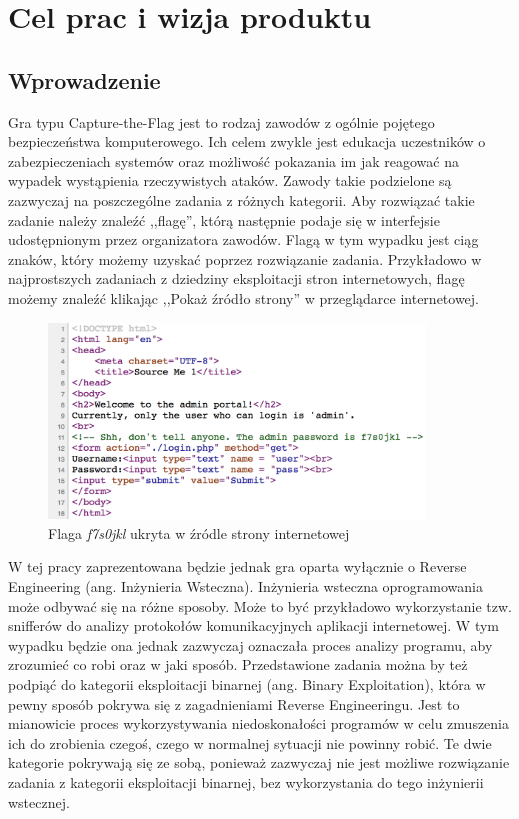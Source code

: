 \documentclass[language=polish,type=eng]{aghmodern}
\author{Piotr Szczygieł}
\date{2020}
\begin{document}
\frontmatter
\maketitle
\tableofcontents

\mainmatter

\chapter{Cel prac i wizja produktu}

\section{Wprowadzenie}

Gra typu Capture-the-Flag jest to rodzaj zawodów z ogólnie pojętego
bezpieczeństwa komputerowego. Ich celem zwykle jest edukacja uczestników
o zabezpieczeniach systemów oraz możliwość pokazania im jak reagować
na wypadek wystąpienia rzeczywistych ataków. Zawody takie podzielone są zazwyczaj
na poszczególne zadania z różnych kategorii. Aby rozwiązać takie zadanie należy
znaleźć ,,flagę'', którą następnie podaje się w interfejsie udostępnionym przez
organizatora zawodów. Flagą w tym wypadku jest ciąg znaków, który możemy uzyskać
poprzez rozwiązanie zadania. Przykładowo w najprostszych zadaniach
z dziedziny eksploitacji stron internetowych, flagę możemy znaleźć klikając
,,Pokaż źródło strony'' w przeglądarce internetowej.

\begin{figure}[H]
\centering
\includegraphics[width=10cm]{flag_page_source}
\caption{Flaga \emph{f7s0jkl} ukryta w źródle strony internetowej}
\end{figure}

W tej pracy zaprezentowana będzie jednak gra oparta
wyłącznie o Reverse Engineering (ang. Inżynieria Wsteczna).
Inżynieria wsteczna oprogramowania może odbywać się na różne sposoby.
Może to być przykładowo wykorzystanie tzw. snifferów do analizy protokołów
komunikacyjnych aplikacji internetowej. W tym wypadku będzie ona jednak
zazwyczaj oznaczała proces analizy programu, aby zrozumieć co robi
oraz w jaki sposób. Przedstawione zadania można by też podpiąć do kategorii
eksploitacji binarnej (ang. Binary Exploitation), która w pewny sposób pokrywa
się z zagadnieniami Reverse Engineeringu. Jest to mianowicie proces
wykorzystywania niedoskonałości programów w celu zmuszenia ich do zrobienia
czegoś, czego w normalnej sytuacji nie powinny robić. Te dwie kategorie pokrywają
się ze sobą, ponieważ zazwyczaj nie jest możliwe rozwiązanie zadania z kategorii
eksploitacji binarnej, bez wykorzystania do tego inżynierii wstecznej.
\end{document}
